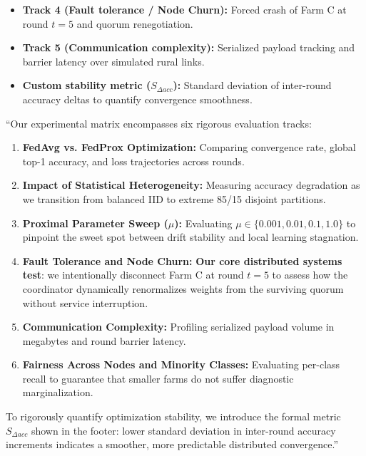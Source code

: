 \documentclass[11pt,a4paper]{article}
\begin{document}
\begin{tcolorbox}[colframe=primaryblue, title=\textbf{Key Distributed Systems Points to Emphasize}]
\begin{itemize}[leftmargin=*]
    \item \textbf{Track 4 (Fault tolerance / Node Churn):} Forced crash of Farm C at round $t=5$ and quorum renegotiation.
    \item \textbf{Track 5 (Communication complexity):} Serialized payload tracking and barrier latency over simulated rural links.
    \item \textbf{Custom stability metric ($S_{\Delta acc}$):} Standard deviation of inter-round accuracy deltas to quantify convergence smoothness.
\end{itemize}
\end{tcolorbox}

\begin{tcolorbox}[colframe=darkgreen, title=\textbf{What to Say in the Presentation (Literal Script)}]
``Our experimental matrix encompasses six rigorous evaluation tracks:
\begin{enumerate}
    \item \textbf{FedAvg vs. FedProx Optimization:} Comparing convergence rate, global top-1 accuracy, and loss trajectories across rounds.
    \item \textbf{Impact of Statistical Heterogeneity:} Measuring accuracy degradation as we transition from balanced IID to extreme 85/15 disjoint partitions.
    \item \textbf{Proximal Parameter Sweep ($\mu$):} Evaluating $\mu \in \{0.001, 0.01, 0.1, 1.0\}$ to pinpoint the sweet spot between drift stability and local learning stagnation.
    \item \textbf{Fault Tolerance and Node Churn:} \textbf{Our core distributed systems test}: we intentionally disconnect Farm C at round $t=5$ to assess how the coordinator dynamically renormalizes weights from the surviving quorum without service interruption.
    \item \textbf{Communication Complexity:} Profiling serialized payload volume in megabytes and round barrier latency.
    \item \textbf{Fairness Across Nodes and Minority Classes:} Evaluating per-class recall to guarantee that smaller farms do not suffer diagnostic marginalization.
\end{enumerate}
To rigorously quantify optimization stability, we introduce the formal metric $S_{\Delta acc}$ shown in the footer: lower standard deviation in inter-round accuracy increments indicates a smoother, more predictable distributed convergence.''
\end{tcolorbox}
\end{document}

